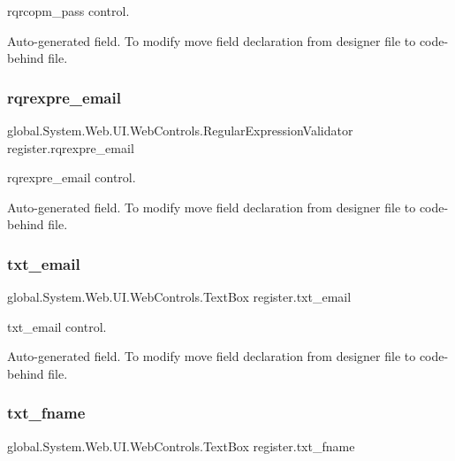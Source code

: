 rqrcopm\+\_\+pass control. 

Auto-\/generated field. To modify move field declaration from designer file to code-\/behind file. \mbox{\label{classregister_a8044c756d737453ee6ccfb3a734d2cc3}} 
\subsubsection{\texorpdfstring{rqrexpre\_email}{rqrexpre\_email}}
{\footnotesize\ttfamily global.\+System.\+Web.\+U\+I.\+Web\+Controls.\+Regular\+Expression\+Validator register.\+rqrexpre\+\_\+email\hspace{0.3cm}{\ttfamily [protected]}}



rqrexpre\+\_\+email control. 

Auto-\/generated field. To modify move field declaration from designer file to code-\/behind file. \mbox{\label{classregister_af0e86bad54e5e24f260495ae5a3792e4}} 
\subsubsection{\texorpdfstring{txt\_email}{txt\_email}}
{\footnotesize\ttfamily global.\+System.\+Web.\+U\+I.\+Web\+Controls.\+Text\+Box register.\+txt\+\_\+email\hspace{0.3cm}{\ttfamily [protected]}}



txt\+\_\+email control. 

Auto-\/generated field. To modify move field declaration from designer file to code-\/behind file. \mbox{\label{classregister_a6830f183fcfc1e8c1bf08e053f4b5060}} 
\subsubsection{\texorpdfstring{txt\_fname}{txt\_fname}}
{\footnotesize\ttfamily global.\+System.\+Web.\+U\+I.\+Web\+Controls.\+Text\+Box register.\+txt\+\_\+fname\hspace{0.3cm}{\ttfamily [protected]}}



